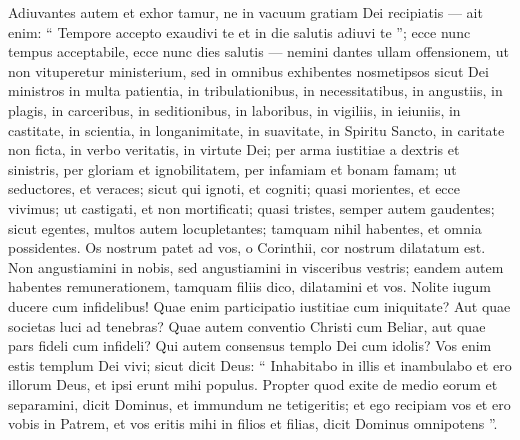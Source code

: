 \begin{biblechapter}
\begin{biblechapter}
\begin{biblechapter}
\begin{biblechapter}
\begin{biblechapter}
\begin{biblechapter}
\verse Adiuvantes autem et exhor tamur, ne in vacuum gratiam Dei recipiatis 
 \verse — ait enim:
 “ Tempore accepto exaudivi te
 et in die salutis adiuvi te ”;
 ecce nunc tempus acceptabile, ecce nunc dies salutis — 
\verse nemini dantes ullam offensionem, ut non vituperetur ministerium, 
\verse sed in omnibus exhibentes nosmetipsos sicut Dei ministros in multa patientia, in tribulationibus, in necessitatibus, in angustiis, 
\verse in plagis, in carceribus, in seditionibus, in laboribus, in vigiliis, in ieiuniis, 
\verse in castitate, in scientia, in longanimitate, in suavitate, in Spiritu Sancto, in caritate non ficta, 
\verse in verbo veritatis, in virtute Dei; per arma iustitiae a dextris et sinistris, 
 \verse per gloriam et ignobilitatem, per infamiam et bonam famam; ut seductores, et veraces; 
\verse sicut qui ignoti, et cogniti; quasi morientes, et ecce vivimus; ut castigati, et non mortificati; 
\verse quasi tristes, semper autem gaudentes; sicut egentes, multos autem locupletantes; tamquam nihil habentes, et omnia possidentes.
 \verse Os nostrum patet ad vos, o Corinthii, cor nostrum dilatatum est. 
\verse Non angustiamini in nobis, sed angustiamini in visceribus vestris; 
\verse eandem autem habentes remunerationem, tamquam filiis dico, dilatamini et vos.
 \verse Nolite iugum ducere cum infidelibus! Quae enim participatio iustitiae cum iniquitate? Aut quae societas luci ad tenebras? 
\verse Quae autem conventio Christi cum Beliar, aut quae pars fideli cum infideli? 
\verse Qui autem consensus templo Dei cum idolis? Vos enim estis templum Dei vivi; sicut dicit Deus:
 “ Inhabitabo in illis et inambulabo
 et ero illorum Deus, et ipsi erunt mihi populus.
 \verse Propter quod exite de medio eorum
 et separamini, dicit Dominus,
 et immundum ne tetigeritis;
 et ego recipiam vos
 \verse et ero vobis in Patrem,
 et vos eritis mihi in filios et filias,
 dicit Dominus omnipotens ”.
 

\end{biblechapter}
\end{biblechapter}
\end{biblechapter}
\end{biblechapter}
\end{biblechapter}
\end{biblechapter}
